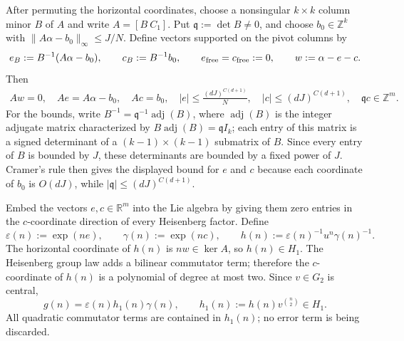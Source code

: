 \documentclass[twoside]{aomart}
\makeatletter
\theoremstyle{paperplain}
\theoremstyle{paperdefinition}
\renewenvironment{proof}[1][\proofname]{\par\pushQED{\qed}%
  \normalfont\topsep6\p@\@plus3\p@\relax\trivlist
  \item[\hskip\labelsep\itshape #1\@addpunct{.}]\ignorespaces
}{\popQED\endtrivlist\@endpefalse}
\numberwithin{equation}{section}
\makeatother
\begin{document}
\begin{proof}
After permuting the horizontal coordinates, choose a nonsingular $k\times k$
column minor $B$ of $A$ and write $A=[B\ C_1]$.  Put
$\mathfrak q:=\det B\ne0$, and choose $b_0\in\mathbb Z^k$ with
$\|A\alpha-b_0\|_\infty\le J/N$.  Define vectors supported on the pivot
columns by
\begin{equation*}
 e_B:=B^{-1}(A\alpha-b_0),\qquad
 c_B:=B^{-1}b_0,\qquad e_{\rm free}=c_{\rm free}:=0,\qquad
 w:=\alpha-e-c.
\end{equation*}
Then
\begin{equation*}
\begin{aligned}
 Aw=0,\quad Ae=A\alpha-b_0,\quad Ac=b_0,
 \quad |e|\le \frac{(dJ)^{C(d+1)}}{N},\quad
 |c|\le(dJ)^{C(d+1)},\quad \mathfrak q c\in\mathbb Z^m.
\end{aligned}
\end{equation*}
For the bounds, write
$B^{-1}=\mathfrak q^{-1}\operatorname{adj}(B)$, where
$\operatorname{adj}(B)$ is the integer adjugate matrix characterized by
$B\operatorname{adj}(B)=\mathfrak q I_k$; each entry of this matrix is a
signed determinant of a $(k-1)\times(k-1)$ submatrix of $B$.  Since every
entry of $B$ is bounded by $J$, these determinants are bounded by a fixed
power of $J$.  Cramer's rule then gives the displayed bound for $e$ and
$c$ because each coordinate of $b_0$ is $O(dJ)$, while
$|\mathfrak q|\le(dJ)^{C(d+1)}$.

Embed the vectors $e,c\in\mathbb R^m$ into the Lie algebra by giving
them zero entries in the $c$-coordinate direction of every Heisenberg
factor.  Define
\begin{equation*}
 \varepsilon(n):=\exp(ne),\qquad
 \gamma(n):=\exp(nc),\qquad
 h(n):=\varepsilon(n)^{-1}u^n\gamma(n)^{-1}.
\end{equation*}
The horizontal coordinate of $h(n)$ is $nw\in\ker A$, so $h(n)\in H_1$.
The Heisenberg group law adds a bilinear commutator term; therefore the
$c$-coordinate of $h(n)$ is a polynomial of degree at most two.  Since
$v\in G_2$ is central,
\begin{equation*}
 g(n)=\varepsilon(n)h_1(n)\gamma(n),\qquad
 h_1(n):=h(n)v^{\binom n2}\in H_1.
\end{equation*}
All quadratic commutator terms are contained in $h_1(n)$; no error term is
being discarded.


\end{proof}
\end{document}
